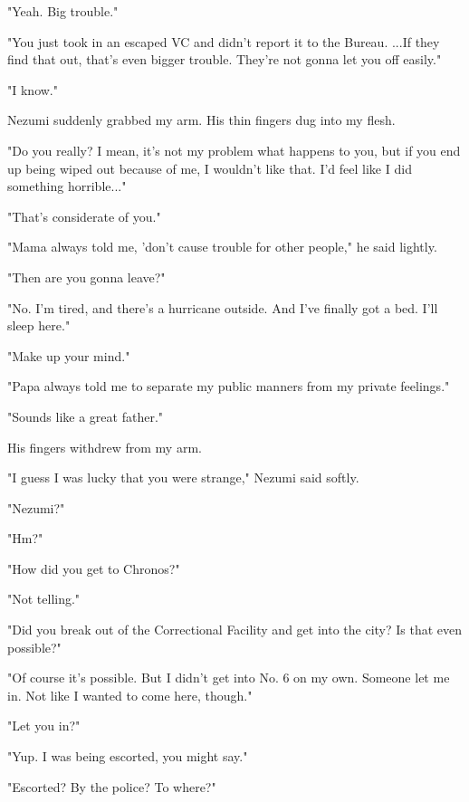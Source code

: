 "Yeah. Big trouble."

"You just took in an escaped VC and didn't report it to the Bureau.
...If they find that out, that's even bigger trouble. They're not gonna
let you off easily."

"I know."

Nezumi suddenly grabbed my arm. His thin fingers dug into my flesh.

"Do you really? I mean, it's not my problem what happens to you, but if
you end up being wiped out because of me, I wouldn't like that. I'd feel
like I did something horrible..."

"That's considerate of you."

"Mama always told me, 'don't cause trouble for other people," he said
lightly.

"Then are you gonna leave?"

"No. I'm tired, and there's a hurricane outside. And I've finally got a
bed. I'll sleep here."

"Make up your mind."

"Papa always told me to separate my public manners from my private
feelings."

"Sounds like a great father."

His fingers withdrew from my arm.

"I guess I was lucky that you were strange," Nezumi said softly.

"Nezumi?"

"Hm?"

"How did you get to Chronos?"

"Not telling."

"Did you break out of the Correctional Facility and get into the city?
Is that even possible?"

"Of course it's possible. But I didn't get into No. 6 on my own. Someone
let me in. Not like I wanted to come here, though."

"Let you in?"

"Yup. I was being escorted, you might say."

"Escorted? By the police? To where?"

